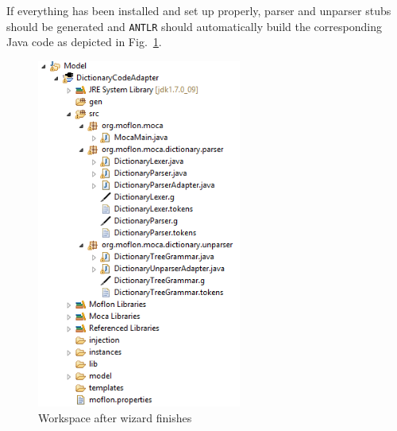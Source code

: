 If everything has been installed and set up properly, parser and unparser stubs should be generated and \texttt{ANTLR} should automatically build the corresponding Java code as depicted in Fig.~\ref{fig:moca-3-WizardResult}. 

\begin{figure}[!htbp]
\begin{center}
 \includegraphics[width=0.6\textwidth]{pics/moca/2TextToMocaTree/3-WizardResult.png}
  \caption{Workspace after wizard finishes}
  \label{fig:moca-3-WizardResult}
\end{center}
\end{figure}
